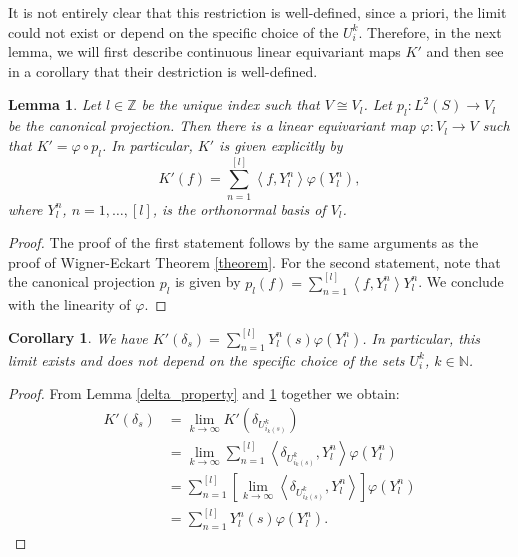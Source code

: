 \documentclass[12pt, a4paper]{article}
\theoremstyle{plain}
\newtheorem{lem}[pro]{Lemma}
\newtheorem{cor}[pro]{Corollary}
\theoremstyle{definition}
\theoremstyle{remark}
\newcommand{\N}{\mathds{N}}
\newcommand{\Z}{\mathds{Z}}
\begin{document}
It is not entirely clear that this restriction is well-defined, since a priori, the limit could not exist or depend on the specific choice of the $U_i^k$. Therefore, in the next lemma, we will first describe continuous linear equivariant maps $K'$ and then see in a corollary that their destriction is well-defined.

\begin{lem}\label{form_K_prime}
Let $l \in \Z$ be the unique index such that $V \cong V_l$. Let $p_l: L^2(S) \to V_l$ be the canonical projection. Then there is a linear equivariant map $\varphi: V_l \to V$ such that $K' = \varphi \circ p_l$. In particular, $K'$ is given explicitly by
\begin{equation*}
K'(f) = \sum_{n= 1}^{[l]} \left\langle f, Y_l^n \right\rangle \varphi(Y_l^n),
\end{equation*}
where $Y_l^n$, $n = 1, \dots, [l]$, is the orthonormal basis of $V_l$.
\end{lem}

\begin{proof}
The proof of the first statement follows by the same arguments as the proof of Wigner-Eckart Theorem \ref{theorem}. For the second statement, note that the canonical projection $p_l$ is given by $p_l(f) = \sum_{n = 1}^{[l]}\left\langle f, Y_l^n \right\rangle Y_l^n$. We conclude with the linearity of $\varphi$.
\end{proof}

\begin{cor}\label{form_K_prime_final}
We have $K'(\delta_s) = \sum_{n = 1}^{[l]} Y_l^n(s) \varphi(Y_l^n)$. In particular, this limit exists and does not depend on the specific choice of the sets $U_i^k$, $k \in \N$.
\end{cor}

\begin{proof}
From Lemma \ref{delta_property} and \ref{form_K_prime} together we obtain:
\begin{align*}
K'(\delta_s) & = \lim_{k \to \infty} K'\left( \delta_{U_{i_k(s)}^k}\right) \\
& = \lim_{k \to \infty} \sum_{n = 1}^{[l]} \left\langle \delta_{U_{i_k(s)}^k}, Y_l^n \right\rangle \varphi(Y_l^n) \\
& = \sum_{n = 1}^{[l]} \left[ \lim_{k \to \infty} \left\langle \delta_{U_{i_k(s)}^k}, Y_l^n\right\rangle \right] \varphi(Y_l^n) \\
& = \sum_{n = 1}^{[l]} Y_l^n(s) \varphi(Y_l^n).
\end{align*}
\end{proof}
\end{document}
